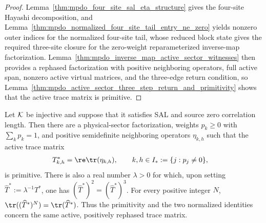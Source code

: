 \begin{proof}
    \leanok
    Lemma~\ref{thm:mpdo_four_site_sal_eta_structure} gives the four-site
    Hayashi decomposition, and
    Lemma~\ref{thm:mpdo_normalized_four_site_tail_entry_ne_zero} yields
    nonzero outer indices for the normalized four-site tail, whose reduced
    block state gives the required three-site closure for the zero-weight
    reparameterized inverse-map factorization.
    Lemma~\ref{thm:mpdo_inverse_map_active_sector_witnesses} then provides a
    rephased factorization with positive neighboring operators, full active
    span, nonzero active virtual matrices, and the three-edge return condition,
    so Lemma~\ref{thm:mpdo_active_sector_three_step_return_and_primitivity}
    shows that the active trace matrix is primitive.
\end{proof}

\begin{lemma}%
    \label{thm:mpdo_active_trace_matrix_zcl_relations}
    \leanok
    Let ${\cal K}$ be injective and suppose that it satisfies SAL and source
    zero correlation length. Then there are a physical-sector factorization,
    weights $p_k\geq0$ with $\sum_k p_k=1$, and positive semidefinite
    neighboring operators $\eta_{k,h}$ such that the active trace matrix
    \begin{align}
        T^*_{k,h}
         & =\re\tr(\eta_{k,h}),
        \qquad k,h\in I_*:=\{j:p_j\ne0\},
        \notag
    \end{align}
    is primitive. There is also a real number $\lambda>0$ for which, upon
    setting $\widehat T^*:=\lambda^{-1}T^*$, one has
    $(\widehat T^*)^2=(\widehat T^*)^3$. For every positive integer $N$,
    $\tr((\widehat T^*)^N)=\tr(\widehat T^*)$. Thus the primitivity and the
    two normalized identities concern the same active, positively rephased
    trace matrix.
\end{lemma}

